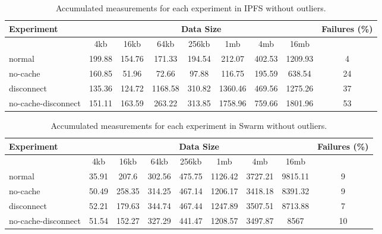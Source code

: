 \begin{table}[H]
\centering
\begin{small}
\caption{Accumulated measurements for each experiment in IPFS without outliers.}
\begin{tabular}{@{}lcccccccc@{}}
\toprule
Experiment    & \multicolumn{7}{c}{Data Size}          & Failures (\%) \\ \midrule
& 4kb  & 16kb  & 64kb  & 256kb  & 1mb  & 4mb  & 16mb              \\ \midrule
normal & 199.88 & 154.76 & 171.33 & 194.54 & 212.07 & 402.53 & 1209.93 & 4 \\
no-cache  & 160.85 & 51.96 & 72.66 & 97.88 & 116.75 & 195.59 & 638.54 & 24 \\
disconnect  & 135.36 & 124.72 & 1168.58 & 310.82 & 1360.46 & 469.56 & 1275.26 & 37 \\
no-cache-disconnect  & 151.11 & 163.59 & 263.22 & 313.85 & 1758.96 & 759.66 & 1801.96  & 53 \\
\bottomrule
\end{tabular}
\end{small}
\end{table}

\begin{table}[H]
\centering
\begin{small}
\caption{Accumulated measurements for each experiment in Swarm without outliers.}
\begin{tabular}{@{}lcccccccc@{}}
\toprule
Experiment    & \multicolumn{7}{c}{Data Size}          & Failures (\%) \\ \midrule
& 4kb  & 16kb  & 64kb  & 256kb  & 1mb  & 4mb  & 16mb              \\ \midrule
normal & 35.91 & 207.6 & 302.56 & 475.75 & 1126.42 & 3727.21 & 9815.11 & 9 \\
no-cache  & 50.49 & 258.35 & 314.25 & 467.14 & 1206.17 & 3418.18 & 8391.32 & 9 \\
disconnect  & 52.21 & 179.63 & 344.74 & 467.44 & 1247.89 & 3507.51 & 8713.88 & 7 \\
no-cache-disconnect  & 51.54 & 152.27 & 327.29 & 441.47 & 1208.57 & 3497.87 & 8567 & 10 \\
\bottomrule
\end{tabular}
\end{small}
\end{table}




